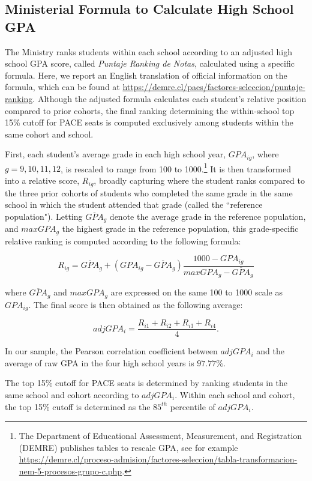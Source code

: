 \subsection{Ministerial Formula to Calculate High School GPA}\label{sec:ptjeranking}

The Ministry ranks students within each school according to an adjusted high school GPA score, called {\itshape Puntaje Ranking de Notas}, calculated using a specific formula. Here, we report an English translation of official information on the formula, which can be found at \url{https://demre.cl/paes/factores-seleccion/puntaje-ranking}. Although the adjusted formula calculates each student's relative position compared to prior cohorts, the final ranking determining the within-school top 15\% cutoff for PACE seats is computed exclusively among students within the same cohort and school.\par 



First, each student's average grade in each high school year, $GPA_{ig}$, where $g=9,10,11,12$, is rescaled to range from 100 to 1000.\footnote{The Department of Educational Assessment, Measurement, and Registration (DEMRE) publishes tables to rescale GPA, see for example \url{https://demre.cl/proceso-admision/factores-seleccion/tabla-transformacion-nem-5-procesos-grupo-c.php}.} It is then transformed into a relative score, $R_{ig}$, broadly capturing where the student ranks compared to the three prior cohorts of students who completed the same grade in the same school in which the student attended that grade (called the ``reference population"). Letting $\overline{GPA}_g$ denote the average grade in the reference population, and $maxGPA_g$ the highest grade in the reference population, this grade-specific relative ranking is computed according to the following formula:

$$R_{ig}=\overline{GPA}_g+(GPA_{ig}-\overline{GPA}_g)\frac{1000-GPA_{ig}}{maxGPA_g-\overline{GPA}_g}$$

\noindent where $\overline{GPA}_g$ and $maxGPA_g$ are expressed on the same 100 to 1000 scale as $GPA_{ig}$. The final score is then obtained as the following average:

$$adjGPA_{i}=\frac{R_{i1}+R_{i2}+R_{i3}+R_{i4}}{4}.$$

\noindent In our sample, the Pearson correlation coefficient between $adjGPA_{i}$ and the average of raw GPA in the four high school years is $97.77\%$.\par 

The top 15\% cutoff for PACE seats is determined by ranking students in the same school and cohort according to $adjGPA_i$. Within each school and cohort, the top 15\% cutoff is determined as the $85^{th}$ percentile of $adjGPA_i$.